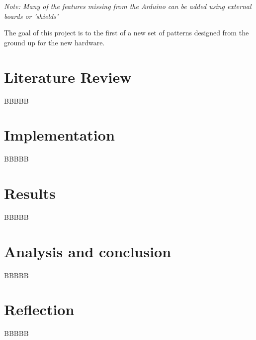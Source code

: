 \documentclass{article}
\begin{document}
\pagebreak
\emph{Note: Many of the features missing from the Arduino can be added using external boards or 'shields'}

The goal of this project is to the first of a new set of patterns designed from the ground up for the new hardware.

\pagebreak
\section{Literature Review}
BBBBB

\section{Implementation}
BBBBB

\section{Results}
BBBBB

\section{Analysis and conclusion}
BBBBB

\section{Reflection}
BBBBB
\end{document}
